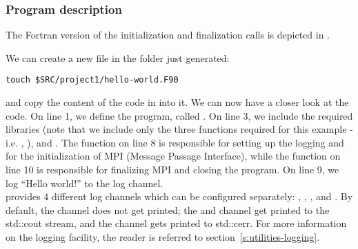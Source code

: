 \subsubsection*{Program description}
The Fortran version of the \Atlas initialization and finalization 
calls is depicted in .
%

%
We can create a new file in the folder  just generated:
%
\begin{lstlisting}[style=BashStyle]
touch $SRC/project1/hello-world.F90
\end{lstlisting}
%
and copy the content of the code in  into it.
We can now have a closer look at the code.
On line 1, we define the program, called .
On line 3, we include the required \Atlas libraries
(note that we include only the three functions required 
for this example - i.e. , ),
and .
The function  on line 8 is responsible for setting up the
logging and for the initialization of MPI (Message Passage Interface), 
while the function  on line 10 is responsible for
finalizing MPI and closing the program.
On line 9, we log ``Hello world!'' to the  log channel.\\
%
\Atlas provides 4 different log channels which can be configured
separately: , , , and
. By default, the  channel does not
get printed; the  and  channel get 
printed to the std::cout stream, and the  channel
gets printed to std::cerr. For more information on the logging
facility, the reader is referred to section~\ref{s:utilities-logging}.


